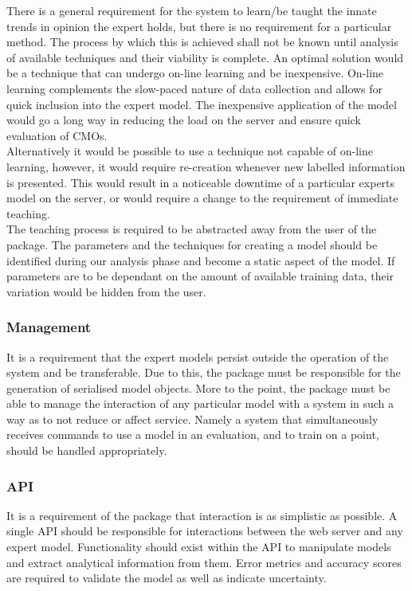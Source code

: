 \documentclass{ecmm427_assignment}
\begin{document}
\quad There is a general requirement for the system to learn/be taught the innate trends in opinion the expert holds, but there is no requirement for a particular method. The process by which this is achieved shall not be known until analysis of available techniques and their viability is complete. An optimal solution would be a technique that can undergo on-line learning and be inexpensive. On-line learning complements the slow-paced nature of data collection and allows for quick inclusion into the expert model. The inexpensive application of the model would go a long way in reducing the load on the server and ensure quick evaluation of CMOs.\\

\quad Alternatively it would be possible to use a technique not capable of on-line learning, however, it would require re-creation whenever new labelled information is presented. This would result in a noticeable downtime of a particular experts model on the server, or would require a change to the requirement of immediate teaching.\\

\quad The teaching process is required to be abstracted away from the user of the package. The parameters and the techniques for creating a model should be identified during our analysis phase and become a static aspect of the model. If parameters are to be dependant on the amount of available training data, their variation would be hidden from the user.

\subsubsection{Management}

\quad It is a requirement that the expert models persist outside the operation of the system and be transferable. Due to this, the package must be responsible for the generation of serialised model objects. More to the point, the package must be able to manage the interaction of any particular model with a system in such a way as to not reduce or affect service. Namely a system that simultaneously receives commands to use a model in an evaluation, and to train on a point, should be handled appropriately.

\subsubsection{API}

\quad It is a requirement of the package that interaction is as simplistic as possible. A single API should be responsible for interactions between the web server and any expert model. Functionality should exist within the API to manipulate models and extract analytical information from them. Error metrics and accuracy scores are required to validate the model as well as indicate uncertainty.
\end{document}
